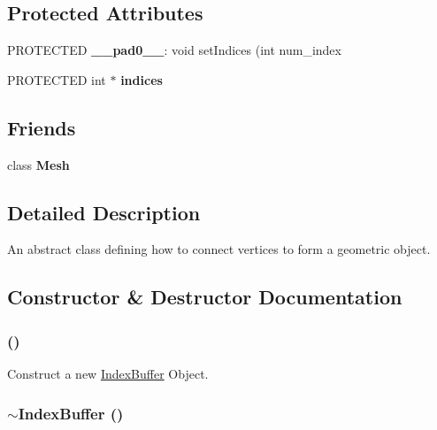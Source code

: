 \subsection*{Protected Attributes}
\begin{CompactItemize}
\item 
\hypertarget{classm3g_1_1IndexBuffer_11d260eb623ff241a55524ad8bc9beb4}{
PROTECTED \textbf{\_\-\_\-pad0\_\-\_\-}: void setIndices (int num\_\-index}
\label{classm3g_1_1IndexBuffer_11d260eb623ff241a55524ad8bc9beb4}

\item 
\hypertarget{classm3g_1_1IndexBuffer_6b7df92152fe609a14f72e9634a55421}{
PROTECTED int $\ast$ \textbf{indices}}
\label{classm3g_1_1IndexBuffer_6b7df92152fe609a14f72e9634a55421}

\end{CompactItemize}
\subsection*{Friends}
\begin{CompactItemize}
\item 
\hypertarget{classm3g_1_1IndexBuffer_a41a130f156b145bffb3f4b5172c4c93}{
class \textbf{Mesh}}
\label{classm3g_1_1IndexBuffer_a41a130f156b145bffb3f4b5172c4c93}

\end{CompactItemize}


\subsection{Detailed Description}
An abstract class defining how to connect vertices to form a geometric object. 

\subsection{Constructor \& Destructor Documentation}
\hypertarget{classm3g_1_1IndexBuffer_d2e68a2d7c6c753d3abfeef42ee79427}{
\subsubsection[{IndexBuffer}]{ ()}}
\label{classm3g_1_1IndexBuffer_d2e68a2d7c6c753d3abfeef42ee79427}


Construct a new \hyperlink{classm3g_1_1IndexBuffer}{IndexBuffer} Object. \hypertarget{classm3g_1_1IndexBuffer_ac7952364fe4d2d7b2731da5380c841c}{
\subsubsection[{$\sim$IndexBuffer}]{\setlength{\rightskip}{0pt plus 5cm}$\sim${\bf IndexBuffer} ()}}
\label{classm3g_1_1IndexBuffer_ac7952364fe4d2d7b2731da5380c841c}


